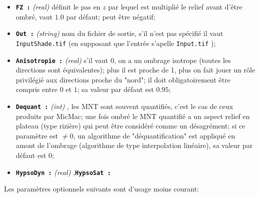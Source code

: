 \begin{itemize}
   \item {\tt \bf FZ :} \emph{(real)}  d\'efinit le pas en $z$ par lequel
         est multipli\'e le relief avant d'\^etre ombr\'e, vaut $1.0$
         par d\'efaut; peut \^etre n\'egatif;

   \item {\tt \bf Out :} \emph{(string)}  nom du fichier de sortie, s'il n'est 
         pas sp\'ecifi\'e il vaut {\tt InputShade.tif}  (en
         supposant que l'entr\'ee s'apelle  {\tt Input.tif} );

   \item {\tt \bf Anisotropie :} \emph{(real)} s'il vaut $0$, on a
         un ombrage isotrope (toutes les directions sont \'equivalentes);
         plus il est proche de 1, plus on fait jouer un r\^ole privil\'egi\'e
         aux directions proche du "nord"; il doit obligatoirement \^etre
         compris entre $0$ et $1$; sa valeur par d\'efaut est $0.95$;

   \item {\tt \bf Dequant :} \emph{(int)}  , les MNT sont souvent quantifi\'es,
         c'est le cas de ceux produits par MicMac; une fois ombr\'e le MNT
         quantifi\'e a un aspect relief en plateau (type rizi\`ere) qui
         peut \^etre consid\'er\'e comme un d\'esagr\'ement; si ce
         param\`etre est $\neq 0$, un algorithme de "d\'equantification"
         est appliqu\'e en amont de l'ombrage (algorithme de type interpolation
         lin\'eaire), sa valeur par d\'efaut est $0$;

   \item {\tt \bf HypsoDyn :} \emph{(real)}  ,{\tt \bf HypsoSat :}

\end{itemize}

Les param\`etres optionnels suivants sont d'usage moins courant:



